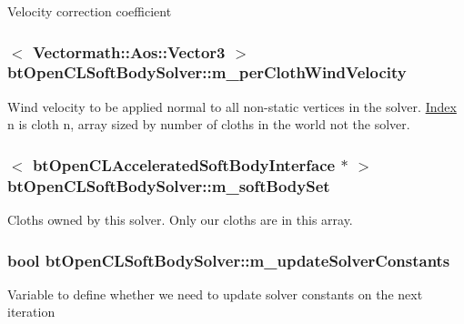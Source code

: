 Velocity correction coefficient \hypertarget{classbt_open_c_l_soft_body_solver_a35942277432e994af4343e05746badf6}{
\subsubsection[{m\+\_\+per\+Cloth\+Wind\+Velocity}]{$<$ {\bf Vectormath\+::\+Aos\+::\+Vector3} $>$ bt\+Open\+C\+L\+Soft\+Body\+Solver\+::m\+\_\+per\+Cloth\+Wind\+Velocity\hspace{0.3cm}{\ttfamily [protected]}}}\label{classbt_open_c_l_soft_body_solver_a35942277432e994af4343e05746badf6}
Wind velocity to be applied normal to all non-\/static vertices in the solver. \hyperlink{struct_index}{Index} n is cloth n, array sized by number of cloths in the world not the solver. \hypertarget{classbt_open_c_l_soft_body_solver_a13f9eba3bc913410a703c320d2154916}{
\subsubsection[{m\+\_\+soft\+Body\+Set}]{$<$ {\bf bt\+Open\+C\+L\+Accelerated\+Soft\+Body\+Interface} $\ast$ $>$ bt\+Open\+C\+L\+Soft\+Body\+Solver\+::m\+\_\+soft\+Body\+Set\hspace{0.3cm}{\ttfamily [protected]}}}\label{classbt_open_c_l_soft_body_solver_a13f9eba3bc913410a703c320d2154916}
Cloths owned by this solver. Only our cloths are in this array. \hypertarget{classbt_open_c_l_soft_body_solver_a44c3d62831247081f6e79ac1c0b5fff7}{
\subsubsection[{m\+\_\+update\+Solver\+Constants}]{\setlength{\rightskip}{0pt plus 5cm}bool bt\+Open\+C\+L\+Soft\+Body\+Solver\+::m\+\_\+update\+Solver\+Constants\hspace{0.3cm}{\ttfamily [protected]}}}\label{classbt_open_c_l_soft_body_solver_a44c3d62831247081f6e79ac1c0b5fff7}
Variable to define whether we need to update solver constants on the next iteration 


